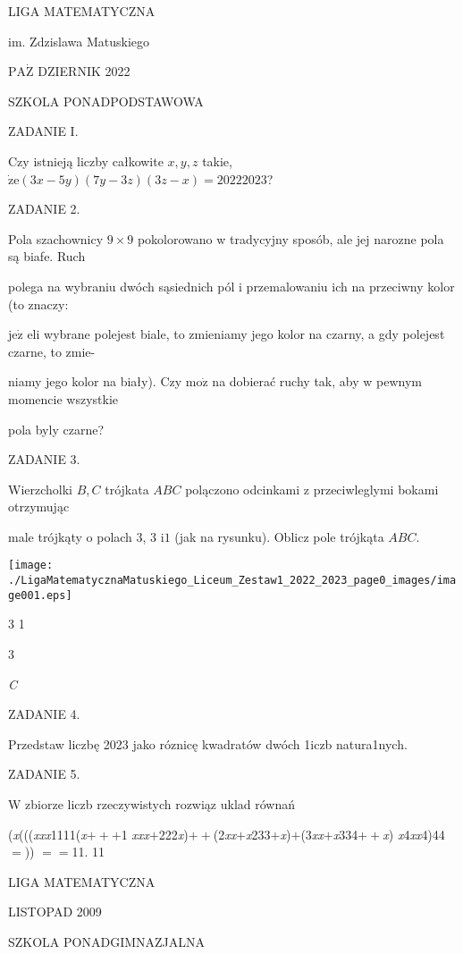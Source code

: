 \documentclass[a4paper,12pt]{article}
\begin{document}
LIGA MATEMATYCZNA

im. Zdzislawa Matuskiego

$\mathrm{P}\mathrm{A}\dot{\mathrm{Z}}$ DZIERNIK 2022

SZKOLA PONADPODSTAWOWA

ZADANIE I.

Czy istnieją liczby całkowite $x, y, z$ takie, $\dot{\mathrm{z}}\mathrm{e}(3x-5y)(7y-3z)(3z-x)=20222023$?

ZADANIE 2.

Pola szachownicy $9\times 9$ pokolorowano w tradycyjny sposób, ale jej narozne pola są biafe. Ruch

polega na wybraniu dwóch sąsiednich pól i przemalowaniu ich na przeciwny kolor (to znaczy:

$\mathrm{j}\mathrm{e}\dot{\mathrm{z}}$ eli wybrane polejest biale, to zmieniamy jego kolor na czarny, a gdy polejest czarne, to zmie-

niamy jego kolor na biały). Czy $\mathrm{m}\mathrm{o}\dot{\mathrm{z}}$ na dobierać ruchy tak, aby w pewnym momencie wszystkie

pola byly czarne?

ZADANIE 3.

Wierzcholki $B, C$ trójkata $ABC$ polączono odcinkami z przeciwleglymi bokami otrzymując

male trójkąty o polach 3, 3 $\mathrm{i}1$ (jak na rysunku). Oblicz pole trójkąta $ABC.$
\begin{center}
\texttt{[image: ./LigaMatematycznaMatuskiego\_Liceum\_Zestaw1\_2022\_2023\_page0\_images/image001.eps]}
\end{center}
3 1

3

{\it C}

ZADANIE 4.

Przedstaw liczbę 2023 jako róznicę kwadratów dwóch 1iczb natura1nych.

ZADANIE 5.

W zbiorze liczb rzeczywistych rozwiąz uklad równań

({\it x}((({\it xxx}1111({\it x}$+++$1 {\it xxx}$+$222{\it x})$++$(2{\it xx}$+${\it x}233$+${\it x})$+$(3{\it xx}$+${\it x}334$++${\it x}) {\it x}4{\it xx}4)44$=$)) $==$11. 11






LIGA MATEMATYCZNA

LISTOPAD 2009

SZKOLA PONADGIMNAZJALNA
\end{document}
